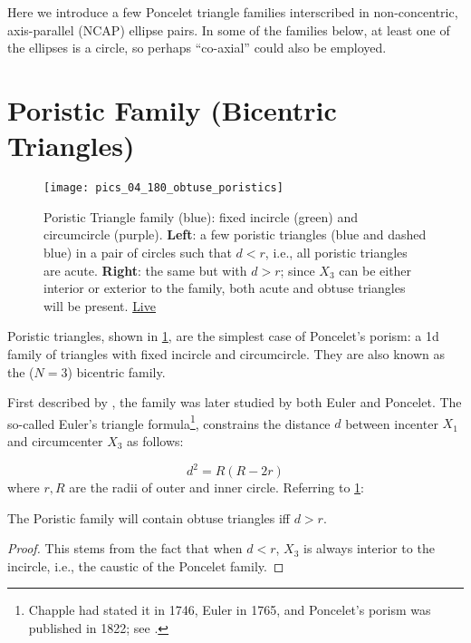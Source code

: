Here we introduce a few Poncelet triangle families interscribed in non-concentric, axis-parallel (NCAP) ellipse pairs. In some of the families below, at least one of the ellipses is a circle, so perhaps ``co-axial'' could also be employed.

\section{Poristic Family (Bicentric Triangles)}
\label{sec:04-poristic}

\begin{figure}
    \centering
    \texttt{[image: pics\_04\_180\_obtuse\_poristics]}
    \caption{Poristic Triangle family (blue): fixed incircle (green) and circumcircle (purple). \textbf{Left}: a few poristic triangles (blue and dashed blue) in a pair of circles such that $d<r$, i.e.,  all poristic triangles are acute. \textbf{Right}: the same but with $d>r$; since $X_3$ can be either interior or exterior to the family, both acute and obtuse triangles will be present. \href{https://bit.ly/3bg19iD}{Live}}
    \label{fig:04-poristic obtuse}
\end{figure}

Poristic triangles, shown in \cref{fig:04-poristic obtuse}, are the simplest case of Poncelet's porism: a 1d family of triangles with fixed incircle and circumcircle. They are also known as the ($N=3$) bicentric family.

First described by \cite{chapple1746-poristics}, the family was later studied by both Euler and Poncelet. The so-called Euler's triangle formula\footnote{Chapple had stated it in 1746, Euler in 1765, and Poncelet's porism was published in 1822; see \cite{centina15}.}, constrains the distance $d$ between incenter $X_1$ and circumcenter $X_3$ as follows:

\begin{equation}
d^2=R(R-2 r)
\label{eq:04-euler-poristic}
\end{equation}
where $r,R$ are the radii of outer and inner circle. Referring to \cref{fig:04-poristic obtuse}:

\begin{proposition}
The Poristic family will contain obtuse triangles iff $d>r$.
\end{proposition}

\begin{proof}
This stems from the fact that when $d<r$, $X_3$ is always interior to the incircle, i.e., the caustic of the Poncelet family. 
\end{proof}

